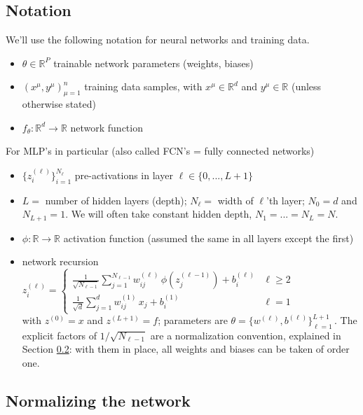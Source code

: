 \documentclass[11pt]{article}
\newcommand{\R}{\mathbb{R}}
\begin{document}
\subsection{Notation}
\label{sec:setup}

We'll use the following notation for neural networks and training data.

\begin{itemize}
    \item $\theta\in \R^P$ trainable network parameters (weights, biases)
    \item $(x^\mu,y^\mu)_{\mu=1}^n$ training data samples, with $x^\mu\in \R^d$ and $y^\mu\in \R$ (unless otherwise stated)
    \item $f_\theta:\R^d\to \R$ network function
\end{itemize}

\noindent For MLP's in particular (also called FCN's = fully connected networks)
\begin{itemize}
    \item $\{z_i^{(\ell)}\}_{i=1}^{N_\ell}$ pre-activations in layer $\ell\in \{0,...,L+1\}$
    \item $L=$ number of hidden layers (depth); $N_\ell = $ width of $\ell$'th layer; $N_0=d$ and $N_{L+1}=1$. We will often take constant hidden depth, $N_1=...=N_L=N$.
    \item $\phi:\R\to \R$ activation function (assumed the same in all layers except the first) 
    \item network recursion $z_i^{(\ell)} = \begin{cases} \frac{1}{\sqrt{N_{\ell-1}}}\sum_{j=1}^{N_{\ell-1}}w^{(\ell)}_{ij}\,\phi(z^{(\ell-1)}_j)+ b^{(\ell)}_i & \ell\geq 2 \\[.2cm]  \frac{1}{\sqrt d}\sum_{j=1}^{d}w^{(1)}_{ij}\,x_j+ b^{(1)}_i & \ell = 1 \end{cases}$ \\
    with $z^{(0)} = x$ and $z^{(L+1)} = f$; parameters are $\theta = \{w^{(\ell)},b^{(\ell)}\}_{\ell=1}^{L+1}$\,. The explicit factors of $1/\sqrt{N_{\ell-1}}$ are a normalization convention, explained in Section \ref{sec:basicscaling}: with them in place, all weights and biases can be taken of order one.
\end{itemize}


\subsection{Normalizing the network}
\label{sec:basicscaling}
\end{document}
